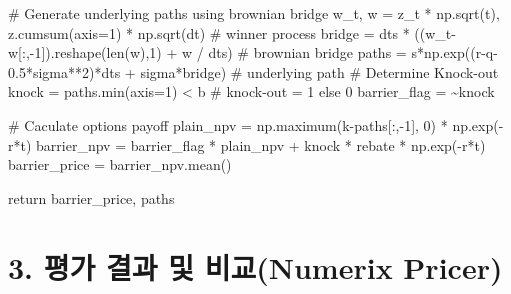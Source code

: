 \documentclass[
  a4paper,
  DIV=11,
  numbers=noendperiod]{scrreprt}
\newenvironment{Shaded}{\begin{snugshade}}{\end{snugshade}}
\newcommand{\BuiltInTok}[1]{\textcolor[rgb]{0.00,0.23,0.31}{#1}}
\newcommand{\CommentTok}[1]{\textcolor[rgb]{0.37,0.37,0.37}{#1}}
\newcommand{\ControlFlowTok}[1]{\textcolor[rgb]{0.00,0.23,0.31}{#1}}
\newcommand{\DecValTok}[1]{\textcolor[rgb]{0.68,0.00,0.00}{#1}}
\newcommand{\FloatTok}[1]{\textcolor[rgb]{0.68,0.00,0.00}{#1}}
\newcommand{\NormalTok}[1]{\textcolor[rgb]{0.00,0.23,0.31}{#1}}
\newcommand{\OperatorTok}[1]{\textcolor[rgb]{0.37,0.37,0.37}{#1}}
\begin{document}
\begin{Shaded}
\begin{Highlighting}[]
    \CommentTok{\# Generate underlying paths using brownian bridge}
\NormalTok{    w\_t, w }\OperatorTok{=}\NormalTok{ z\_t }\OperatorTok{*}\NormalTok{ np.sqrt(t), z.cumsum(axis}\OperatorTok{=}\DecValTok{1}\NormalTok{) }\OperatorTok{*}\NormalTok{ np.sqrt(dt) }\CommentTok{\# winner process}
\NormalTok{    bridge }\OperatorTok{=}\NormalTok{ dts }\OperatorTok{*}\NormalTok{ ((w\_t}\OperatorTok{{-}}\NormalTok{ w[:,}\OperatorTok{{-}}\DecValTok{1}\NormalTok{]).reshape(}\BuiltInTok{len}\NormalTok{(w),}\DecValTok{1}\NormalTok{) }\OperatorTok{+}\NormalTok{ w }\OperatorTok{/}\NormalTok{ dts) }\CommentTok{\# brownian bridge}
\NormalTok{    paths }\OperatorTok{=}\NormalTok{ s}\OperatorTok{*}\NormalTok{np.exp((r}\OperatorTok{{-}}\NormalTok{q}\OperatorTok{{-}}\FloatTok{0.5}\OperatorTok{*}\NormalTok{sigma}\OperatorTok{**}\DecValTok{2}\NormalTok{)}\OperatorTok{*}\NormalTok{dts }\OperatorTok{+}\NormalTok{ sigma}\OperatorTok{*}\NormalTok{bridge) }\CommentTok{\# underlying path}
    \CommentTok{\# Determine Knock{-}out}
\NormalTok{    knock }\OperatorTok{=}\NormalTok{ paths.}\BuiltInTok{min}\NormalTok{(axis}\OperatorTok{=}\DecValTok{1}\NormalTok{) }\OperatorTok{\textless{}}\NormalTok{ b }\CommentTok{\# knock{-}out = 1 else 0}
\NormalTok{    barrier\_flag }\OperatorTok{=} \OperatorTok{\textasciitilde{}}\NormalTok{knock}

    \CommentTok{\# Caculate options payoff}
\NormalTok{    plain\_npv }\OperatorTok{=}\NormalTok{ np.maximum(k}\OperatorTok{{-}}\NormalTok{paths[:,}\OperatorTok{{-}}\DecValTok{1}\NormalTok{], }\DecValTok{0}\NormalTok{) }\OperatorTok{*}\NormalTok{ np.exp(}\OperatorTok{{-}}\NormalTok{r}\OperatorTok{*}\NormalTok{t)}
\NormalTok{    barrier\_npv }\OperatorTok{=}\NormalTok{ barrier\_flag }\OperatorTok{*}\NormalTok{ plain\_npv }\OperatorTok{+}\NormalTok{ knock }\OperatorTok{*}\NormalTok{ rebate }\OperatorTok{*}\NormalTok{ np.exp(}\OperatorTok{{-}}\NormalTok{r}\OperatorTok{*}\NormalTok{t)}
\NormalTok{    barrier\_price }\OperatorTok{=}\NormalTok{ barrier\_npv.mean()}

    \ControlFlowTok{return}\NormalTok{ barrier\_price, paths}
\end{Highlighting}
\end{Shaded}

\section*{3. 평가 결과 및 비교(Numerix
Pricer)}\label{uxd3c9uxac00-uxacb0uxacfc-uxbc0f-uxbe44uxad50numerix-pricer}
\end{document}
